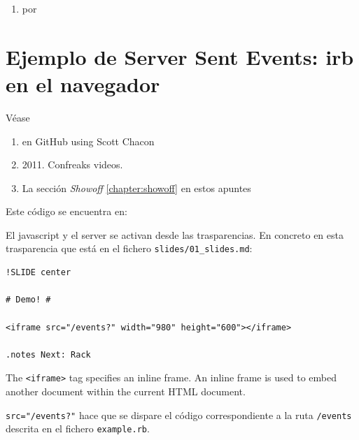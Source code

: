 \begin{enumerate}
\item 
{} por 
\end{enumerate}

\section{Ejemplo de Server Sent Events: irb en el navegador}

Véase 
\begin{enumerate}
\item 
{}
en GitHub using 
Scott Chacon 
\item 
{}
2011. Confreaks videos.
\item La sección {\it Showoff} \ref{chapter:showoff} en estos apuntes
\end{enumerate}

Este código se encuentra en:

El javascript y el server se activan desde las trasparencias. En concreto en esta trasparencia 
que está en el fichero
\verb|slides/01_slides.md|:

\begin{verbatim}
!SLIDE center

# Demo! #

<iframe src="/events?" width="980" height="600"></iframe>

.notes Next: Rack
\end{verbatim}
The \verb|<iframe>| tag specifies an inline frame.
An inline frame is used to embed another document within the current HTML document.

\verb|src="/events?"| hace que se dispare el código correspondiente a la ruta
\verb|/events| descrita en el fichero \verb|example.rb|.

